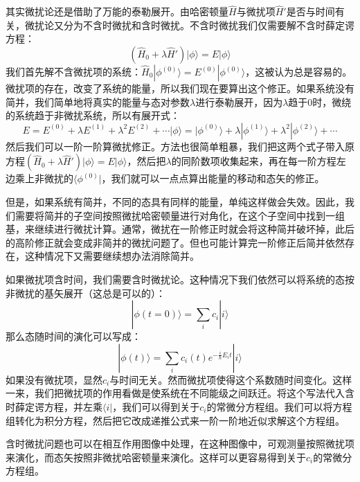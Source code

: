 \documentclass{ctexart}
\begin{document}
其实微扰论还是借助了万能的泰勒展开。由哈密顿量$\hat{H}$与微扰项$\hat{H}'$是否与时间有关，微扰论又分为不含时微扰和含时微扰。不含时微扰我们仅需要解不含时薛定谔方程：
\begin{equation}
(\hat{H}_0+\lambda\hat{H}')|\phi\rangle=E|\phi\rangle
\end{equation}
我们首先解不含微扰项的系统：$\hat{H}_0|\phi^{(0)}\rangle=E^{(0)}|\phi^{(0)}\rangle$，这被认为总是容易的。微扰项的存在，改变了系统的能量，所以我们现在要算出这个修正。如果系统没有简并，我们简单地将真实的能量与态对参数$\lambda$进行泰勒展开，因为$\lambda$趋于0时，微绕的系统趋于非微扰系统，所以有展开式：
\begin{equation}
E=E^{(0)}+\lambda E^{(1)}+\lambda^2 E^{(2)}+\cdots|\phi\rangle=|\phi^{(0)}\rangle+\lambda |\phi^{(1)}\rangle+\lambda^2 |\phi^{(2)}\rangle+\cdots
\end{equation}
然后我们可以一阶一阶算微扰修正。方法也很简单粗暴，我们把这两个式子带入原方程$(\hat{H}_0+\lambda\hat{H}')|\phi\rangle=E|\phi\rangle$，然后把$\lambda$的同阶数项收集起来，再在每一阶方程左边乘上非微扰的$\langle\phi^{(0)}|$，我们就可以一点点算出能量的移动和态矢的修正。

但是，如果系统有简并，不同的态具有同样的能量，单纯这样做会失效。因此，我们需要将简并的子空间按照微扰哈密顿量进行对角化，在这个子空间中找到一组基，来继续进行微扰计算。通常，微扰在一阶修正时就会将这种简并破坏掉，此后的高阶修正就会变成非简并的微扰问题了。但也可能计算完一阶修正后简并依然存在，这种情况下又需要继续想办法消除简并。

如果微扰项含时间，我们需要含时微扰论。这种情况下我们依然可以将系统的态按非微扰的基矢展开（这总是可以的）：
\begin{equation}
|\phi(t=0)\rangle=\sum_i c_i|i\rangle
\end{equation}
那么态随时间的演化可以写成：
\begin{equation}
|\phi(t)\rangle=\sum_i c_i(t)e^{-\frac{i}{\hbar}E_it}|i\rangle
\end{equation}
如果没有微扰项，显然$c_i$与时间无关。然而微扰项使得这个系数随时间变化。这样一来，我们把微扰项的作用看做是使系统在不同能级之间跃迁。将这个写法代入含时薛定谔方程，并左乘$\langle i|$，我们可以得到关于$c_i$的常微分方程组。我们可以将方程组转化为积分方程，然后把它改成递推公式来一阶一阶地近似求解这个方程组。

含时微扰问题也可以在相互作用图像中处理，在这种图像中，可观测量按照微扰项来演化，而态矢按照非微扰哈密顿量来演化。这样可以更容易得到关于$c_i$的常微分方程组。
\end{document}
